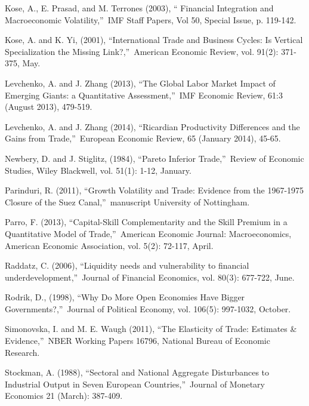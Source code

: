 \documentclass[12pt]{article}
\begin{document}
\begin{thebibliography}{99}
\bibitem{} Kose, A., E. Prasad, and M. Terrones (2003), \textquotedblleft
Financial Integration and Macroeconomic Volatility,\textquotedblright\ IMF
Staff Papers, Vol 50, Special Issue, p. 119-142.

\bibitem{} Kose, A. and K. Yi, (2001), \textquotedblleft International Trade
and Business Cycles: Is Vertical Specialization the Missing
Link?,\textquotedblright\ American Economic Review, vol. 91(2): 371-375, May.

\bibitem{} Levchenko, A. and J. Zhang (2013), \textquotedblleft The Global
Labor Market Impact of Emerging Giants: a Quantitative
Assessment,\textquotedblright\ IMF Economic Review, 61:3 (August 2013),
479-519.

\bibitem{} Levchenko, A. and J. Zhang (2014), \textquotedblleft Ricardian
Productivity Differences and the Gains from Trade,\textquotedblright\
European Economic Review, 65 (January 2014), 45-65.

\bibitem{} Newbery, D. and J. Stiglitz, (1984), \textquotedblleft Pareto
Inferior Trade,\textquotedblright\ Review of Economic Studies, Wiley
Blackwell, vol. 51(1): 1-12, January.

\bibitem{} Parinduri, R. (2011), \textquotedblleft Growth Volatility and
Trade: Evidence from the 1967-1975 Closure of the Suez
Canal,\textquotedblright\ manuscript University of Nottingham.

\bibitem{} Parro, F. (2013), \textquotedblleft Capital-Skill Complementarity
and the Skill Premium in a Quantitative Model of Trade,\textquotedblright\
American Economic Journal: Macroeconomics, American Economic Association,
vol. 5(2): 72-117, April.

\bibitem{} Raddatz, C. (2006), \textquotedblleft Liquidity needs and
vulnerability to financial underdevelopment,\textquotedblright\ Journal of
Financial Economics, vol. 80(3): 677-722, June.

\bibitem{} Rodrik, D., (1998), \textquotedblleft Why Do More Open Economies
Have Bigger Governments?,\textquotedblright\ Journal of Political Economy,
vol. 106(5): 997-1032, October.

\bibitem{} Simonovska, I. and M. E. Waugh (2011), \textquotedblleft The
Elasticity of Trade: Estimates \& Evidence,\textquotedblright\ NBER Working
Papers 16796, National Bureau of Economic Research.

\bibitem{} Stockman, A. (1988), \textquotedblleft Sectoral and National
Aggregate Disturbances to Industrial Output in Seven European
Countries,\textquotedblright\ Journal of Monetary Economics 21 (March):
387-409.


\end{thebibliography}
\end{document}
